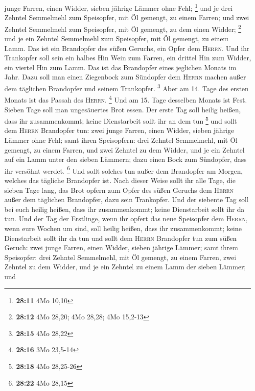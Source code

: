 junge Farren, einen Widder, sieben jährige Lämmer ohne Fehl; \footnote{\textbf{28:11}
  4Mo 10,10}  und je drei Zehntel Semmelmehl zum
Speisopfer, mit Öl gemengt, zu einem Farren; und zwei Zehntel Semmelmehl
zum Speisopfer, mit Öl gemengt, zu dem einen Widder; \footnote{\textbf{28:12}
  4Mo 28,20; 4Mo 28,28; 4Mo 15,2-13}  und je ein Zehntel
Semmelmehl zum Speisopfer, mit Öl gemengt, zu einem Lamm. Das ist ein
Brandopfer des süßen Geruchs, ein Opfer dem \textsc{Herrn}.
 Und ihr Trankopfer soll sein ein halbes Hin Wein zum
Farren, ein drittel Hin zum Widder, ein viertel Hin zum Lamm. Das ist
das Brandopfer eines jeglichen Monats im Jahr.  Dazu soll
man einen Ziegenbock zum Sündopfer dem \textsc{Herrn} machen außer dem
täglichen Brandopfer und seinem Trankopfer. \footnote{\textbf{28:15} 4Mo
  28,22}  Aber am 14. Tage des ersten Monats ist das
Passah des \textsc{Herrn}. \footnote{\textbf{28:16} 3Mo 23,5-14}
 Und am 15. Tage desselben Monats ist Fest. Sieben Tage
soll man ungesäuertes Brot essen.  Der erste Tag soll
heilig heißen, dass ihr zusammenkommt; keine Dienstarbeit sollt ihr an
dem tun \footnote{\textbf{28:18} 4Mo 28,25-26}  und sollt
dem \textsc{Herrn} Brandopfer tun: zwei junge Farren, einen Widder,
sieben jährige Lämmer ohne Fehl;  samt ihren Speisopfern:
drei Zehntel Semmelmehl, mit Öl gemengt, zu einem Farren, und zwei
Zehntel zu dem Widder,  und je ein Zehntel auf ein Lamm
unter den sieben Lämmern;  dazu einen Bock zum Sündopfer,
dass ihr versöhnt werdet. \footnote{\textbf{28:22} 4Mo 28,15}
 Und sollt solches tun außer dem Brandopfer am Morgen,
welches das tägliche Brandopfer ist.  Nach dieser Weise
sollt ihr alle Tage, die sieben Tage lang, das Brot opfern zum Opfer des
süßen Geruchs dem \textsc{Herrn} außer dem täglichen Brandopfer, dazu
sein Trankopfer.  Und der siebente Tag soll bei euch
heilig heißen, dass ihr zusammenkommt; keine Dienstarbeit sollt ihr da
tun.  Und der Tag der Erstlinge, wenn ihr opfert das neue
Speisopfer dem \textsc{Herrn}, wenn eure Wochen um sind, soll heilig
heißen, dass ihr zusammenkommt; keine Dienstarbeit sollt ihr da tun
 und sollt dem \textsc{Herrn} Brandopfer tun zum süßen
Geruch: zwei junge Farren, einen Widder, sieben jährige Lämmer;
 samt ihrem Speisopfer: drei Zehntel Semmelmehl, mit Öl
gemengt, zu einem Farren, zwei Zehntel zu dem Widder, 
und je ein Zehntel zu einem Lamm der sieben Lämmer;  und
